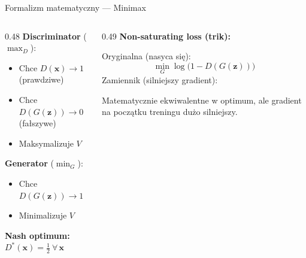 \documentclass[aspectratio=169,12pt]{beamer}
\begin{document}
\begin{frame}{Formalizm matematyczny — Minimax}
\begin{center}
\end{center}
\begin{columns}[T]
\begin{column}{0.48\textwidth}
\textbf{Discriminator} ($\max_D$):
\begin{itemize}
  \item Chce $D(\mathbf{x})\to 1$ (prawdziwe)
  \item Chce $D(G(\mathbf{z}))\to 0$ (fałszywe)
  \item Maksymalizuje $V$
\end{itemize}
\textbf{Generator} ($\min_G$):
\begin{itemize}
  \item Chce $D(G(\mathbf{z}))\to 1$
  \item Minimalizuje $V$
\end{itemize}
\textbf{Nash optimum:} $D^*(\mathbf{x})=\tfrac{1}{2}\ \forall\,\mathbf{x}$
\end{column}
\begin{column}{0.49\textwidth}
\textbf{Non-saturating loss (trik):}
\vspace{0.3em}

Oryginalna (nasyca się):
\[\min_G\log\!\bigl(1-D(G(\mathbf{z}))\bigr)\]
Zamiennik (silniejszy gradient):
\begin{center}
\end{center}
\vspace{0.2em}
{\small Matematycznie ekwiwalentne w optimum, ale gradient na początku treningu dużo silniejszy.}
\end{column}
\end{columns}
\end{frame}
\end{document}
